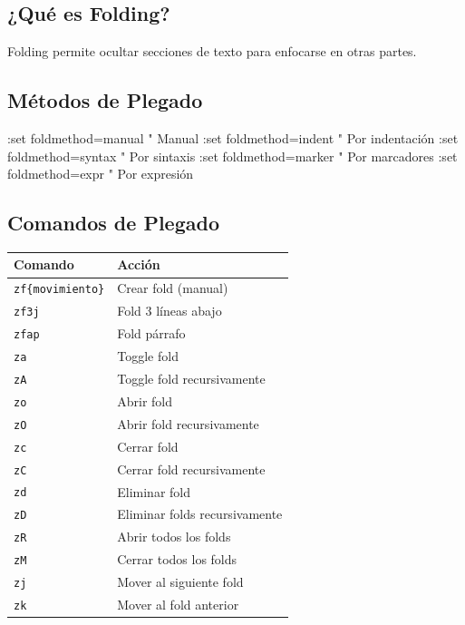 \documentclass[
  doc,
  floatsintext,
  longtable,
  a4paper,
  nolmodern,
  notxfonts,
  notimes,
  12pt,
  colorlinks=true,linkcolor=blue,citecolor=blue,urlcolor=blue]{apa7}
\newenvironment{Shaded}{\begin{snugshade}}{\end{snugshade}}
\newcommand{\NormalTok}[1]{\textcolor[rgb]{0.00,0.23,0.31}{#1}}
\newcounter{none} %
\begin{document}
\subsection{¿Qué es Folding?}\label{quuxe9-es-folding}

Folding permite ocultar secciones de texto para enfocarse en otras
partes.

\subsection{Métodos de Plegado}\label{muxe9todos-de-plegado}

\begin{Shaded}
\begin{Highlighting}[]
\NormalTok{:set foldmethod=manual    " Manual}
\NormalTok{:set foldmethod=indent    " Por indentación}
\NormalTok{:set foldmethod=syntax    " Por sintaxis}
\NormalTok{:set foldmethod=marker    " Por marcadores}
\NormalTok{:set foldmethod=expr      " Por expresión}
\end{Highlighting}
\end{Shaded}

\subsection{Comandos de Plegado}\label{comandos-de-plegado}

{\def\LTcaptype{none} %
\begin{longtable}[]{@{}ll@{}}
\toprule\noalign{}
Comando & Acción \\
\midrule\noalign{}
\endhead
\bottomrule\noalign{}
\endlastfoot
\texttt{zf\{movimiento\}} & Crear fold (manual) \\
\texttt{zf3j} & Fold 3 líneas abajo \\
\texttt{zfap} & Fold párrafo \\
\texttt{za} & Toggle fold \\
\texttt{zA} & Toggle fold recursivamente \\
\texttt{zo} & Abrir fold \\
\texttt{zO} & Abrir fold recursivamente \\
\texttt{zc} & Cerrar fold \\
\texttt{zC} & Cerrar fold recursivamente \\
\texttt{zd} & Eliminar fold \\
\texttt{zD} & Eliminar folds recursivamente \\
\texttt{zR} & Abrir todos los folds \\
\texttt{zM} & Cerrar todos los folds \\
\texttt{zj} & Mover al siguiente fold \\
\texttt{zk} & Mover al fold anterior \\
\end{longtable}
}
\end{document}
